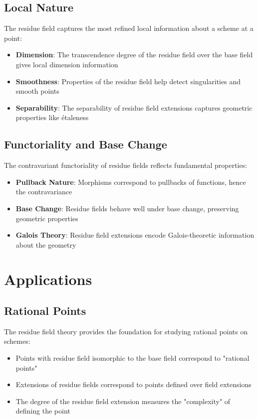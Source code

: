\documentclass{article}
\theoremstyle{definition}
\begin{document}
\subsection{Local Nature}

The residue field captures the most refined local information about a scheme at a point:

\begin{itemize}
\item \textbf{Dimension}: The transcendence degree of the residue field over the base field gives local dimension information
\item \textbf{Smoothness}: Properties of the residue field help detect singularities and smooth points
\item \textbf{Separability}: The separability of residue field extensions captures geometric properties like étaleness
\end{itemize}

\subsection{Functoriality and Base Change}

The contravariant functoriality of residue fields reflects fundamental properties:

\begin{itemize}
\item \textbf{Pullback Nature}: Morphisms correspond to pullbacks of functions, hence the contravariance
\item \textbf{Base Change}: Residue fields behave well under base change, preserving geometric properties
\item \textbf{Galois Theory}: Residue field extensions encode Galois-theoretic information about the geometry
\end{itemize}

\section{Applications}

\subsection{Rational Points}

The residue field theory provides the foundation for studying rational points on schemes:

\begin{itemize}
\item Points with residue field isomorphic to the base field correspond to "rational points"
\item Extensions of residue fields correspond to points defined over field extensions
\item The degree of the residue field extension measures the "complexity" of defining the point
\end{itemize}
\end{document}
